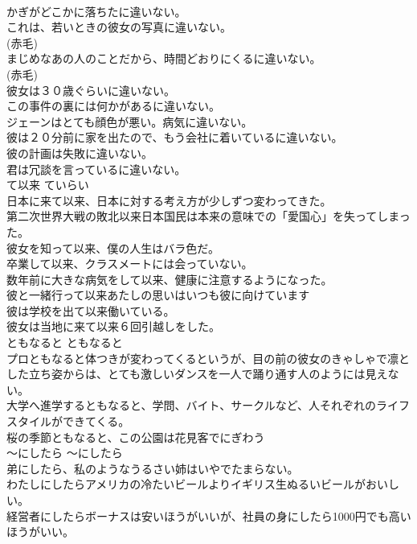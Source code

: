 \documentclass[8pt]{extreport}
\begin{document}
\begin{CJK}{UTF8}{min}
\\	かぎがどこかに落ちたに違いない。  
\\	これは、若いときの彼女の写真に違いない。  
\\	(赤毛)
\\	まじめなあの人のことだから、時間どおりにくるに違いない。  
\\	(赤毛)
\\	彼女は３０歳ぐらいに違いない。  
\\	この事件の裏には何かがあるに違いない。   
\\	ジェーンはとても顔色が悪い。病気に違いない。   
\\	彼は２０分前に家を出たので、もう会社に着いているに違いない。   
\\	彼の計画は失敗に違いない。   
\\	君は冗談を言っているに違いない。   
\\	て以来	ていらい	
\\	日本に来て以来、日本に対する考え方が少しずつ変わってきた。  
\\	第二次世界大戦の敗北以来日本国民は本来の意味での「愛国心」を失ってしまった。  
\\	彼女を知って以来、僕の人生はバラ色だ。  
\\	卒業して以来、クラスメートには会っていない。  
\\	数年前に大きな病気をして以来、健康に注意するようになった。  
\\	彼と一緒行って以来あたしの思いはいつも彼に向けています  
\\	彼は学校を出て以来働いている。   
\\	彼女は当地に来て以来６回引越しをした。   
\\	ともなると	ともなると	
\\	プロともなると体つきが変わってくるというが、目の前の彼女のきゃしゃで凛とした立ち姿からは、とても激しいダンスを一人で踊り通す人のようには見えない。  
\\	大学へ進学するともなると、学問、バイト、サークルなど、人それぞれのライフスタイルができてくる。  
\\	桜の季節ともなると、この公園は花見客でにぎわう  
\\	〜にしたら	〜にしたら	
\\	弟にしたら、私のようなうるさい姉はいやでたまらない。  
\\	わたしにしたらアメリカの冷たいビールよりイギリス生ぬるいビールがおいしい。  
\\	経営者にしたらボーナスは安いほうがいいが、社員の身にしたら1000円でも高いほうがいい。   

\end{CJK}
\end{document}
